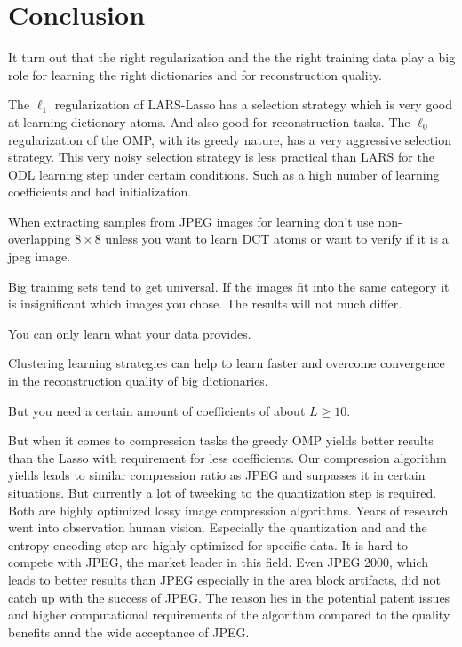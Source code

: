 \chapter{Conclusion}
It turn out that the right regularization and the the right training data
play  a big role for learning the right dictionaries and for reconstruction
quality. 

The $\ell_1$ regularization of LARS-Lasso has a selection strategy
which is very good at learning dictionary atoms. And also good for
reconstruction tasks.  The $\ell_0$ regularization of the OMP, with its greedy
nature, has a very aggressive selection strategy.  This very noisy selection
strategy is less practical than LARS for the ODL learning step under certain
conditions. Such as a high number of learning coefficients and bad
initialization.



When extracting samples from JPEG images for
learning don't use non-overlapping $8 \times 8$ unless you want to learn DCT
atoms or want to verify if it is a jpeg image. 

Big training sets tend to get universal. If the images fit into the same
category it is insignificant which images you chose. The results will not much
differ.

You can only learn what your data provides.

Clustering learning strategies can help to learn faster and overcome
convergence in the reconstruction quality of big dictionaries.


But you need a certain amount of coefficients of about $L \ge 10$.

But when it comes to compression tasks the greedy OMP yields better results
than the Lasso with requirement for less coefficients. 
Our compression algorithm yields leads to similar compression ratio as JPEG
and surpasses it in certain situations. But currently a lot of tweeking to the
quantization step is required. Both are highly optimized lossy image
compression algorithms. Years of research went into observation human vision. 
Especially the quantization and and the entropy encoding step are highly
optimized for specific data. It is hard to compete with JPEG, the market leader
in this field.  Even JPEG 2000, which leads to better results than JPEG
especially in the area block artifacts, did not catch up with the success of
JPEG.  The reason lies in the potential patent issues and higher computational
requirements of the algorithm compared to the quality benefits annd the wide
acceptance of JPEG.

